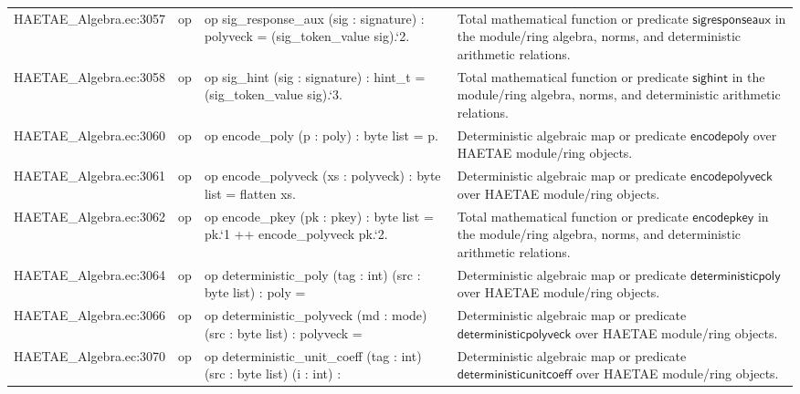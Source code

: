 \documentclass[10pt]{article}
\begin{document}
\begin{longtable}{L{0.11\textwidth}L{0.055\textwidth}L{0.385\textwidth}L{0.41\textwidth}}
HAETAE\_\allowbreak{}Algebra.\allowbreak{}ec:\allowbreak{}3057 & op & {\ttfamily\scriptsize op sig\_\allowbreak{}response\_\allowbreak{}aux (sig : signature) : polyveck = (sig\_\allowbreak{}token\_\allowbreak{}value sig).`2.} & Total mathematical function or predicate $\mathsf{sigresponseaux}$ in the module/ring algebra, norms, and deterministic arithmetic relations. \\
HAETAE\_\allowbreak{}Algebra.\allowbreak{}ec:\allowbreak{}3058 & op & {\ttfamily\scriptsize op sig\_\allowbreak{}hint (sig : signature) : hint\_\allowbreak{}t = (sig\_\allowbreak{}token\_\allowbreak{}value sig).`3.} & Total mathematical function or predicate $\mathsf{sighint}$ in the module/ring algebra, norms, and deterministic arithmetic relations. \\
HAETAE\_\allowbreak{}Algebra.\allowbreak{}ec:\allowbreak{}3060 & op & {\ttfamily\scriptsize op encode\_\allowbreak{}poly (p : poly) : byte list = p.} & Deterministic algebraic map or predicate $\mathsf{encodepoly}$ over HAETAE module/ring objects. \\
HAETAE\_\allowbreak{}Algebra.\allowbreak{}ec:\allowbreak{}3061 & op & {\ttfamily\scriptsize op encode\_\allowbreak{}polyveck (xs : polyveck) : byte list = flatten xs.} & Deterministic algebraic map or predicate $\mathsf{encodepolyveck}$ over HAETAE module/ring objects. \\
HAETAE\_\allowbreak{}Algebra.\allowbreak{}ec:\allowbreak{}3062 & op & {\ttfamily\scriptsize op encode\_\allowbreak{}pkey (pk : pkey) : byte list = pk.`1 ++ encode\_\allowbreak{}polyveck pk.`2.} & Total mathematical function or predicate $\mathsf{encodepkey}$ in the module/ring algebra, norms, and deterministic arithmetic relations. \\
HAETAE\_\allowbreak{}Algebra.\allowbreak{}ec:\allowbreak{}3064 & op & {\ttfamily\scriptsize op deterministic\_\allowbreak{}poly (tag : int) (src : byte list) : poly =} & Deterministic algebraic map or predicate $\mathsf{deterministicpoly}$ over HAETAE module/ring objects. \\
HAETAE\_\allowbreak{}Algebra.\allowbreak{}ec:\allowbreak{}3066 & op & {\ttfamily\scriptsize op deterministic\_\allowbreak{}polyveck (md : mode) (src : byte list) : polyveck =} & Deterministic algebraic map or predicate $\mathsf{deterministicpolyveck}$ over HAETAE module/ring objects. \\
HAETAE\_\allowbreak{}Algebra.\allowbreak{}ec:\allowbreak{}3070 & op & {\ttfamily\scriptsize op deterministic\_\allowbreak{}unit\_\allowbreak{}coeff (tag : int) (src : byte list) (i : int) :} & Deterministic algebraic map or predicate $\mathsf{deterministicunitcoeff}$ over HAETAE module/ring objects. \\

\end{longtable}
\end{document}
